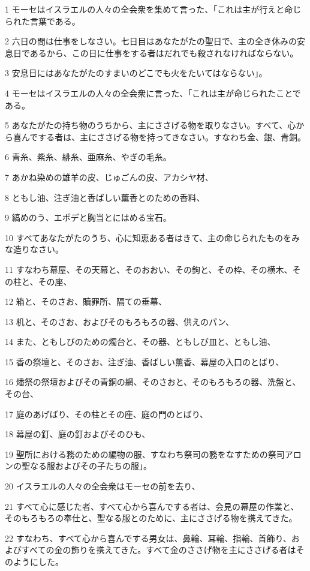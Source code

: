 \par 1 モーセはイスラエルの人々の全会衆を集めて言った、「これは主が行えと命じられた言葉である。
\par 2 六日の間は仕事をしなさい。七日目はあなたがたの聖日で、主の全き休みの安息日であるから、この日に仕事をする者はだれでも殺されなければならない。
\par 3 安息日にはあなたがたのすまいのどこでも火をたいてはならない」。
\par 4 モーセはイスラエルの人々の全会衆に言った、「これは主が命じられたことである。
\par 5 あなたがたの持ち物のうちから、主にささげる物を取りなさい。すべて、心から喜んでする者は、主にささげる物を持ってきなさい。すなわち金、銀、青銅。
\par 6 青糸、紫糸、緋糸、亜麻糸、やぎの毛糸。
\par 7 あかね染めの雄羊の皮、じゅごんの皮、アカシヤ材、
\par 8 ともし油、注ぎ油と香ばしい薫香とのための香料、
\par 9 縞めのう、エポデと胸当とにはめる宝石。
\par 10 すべてあなたがたのうち、心に知恵ある者はきて、主の命じられたものをみな造りなさい。
\par 11 すなわち幕屋、その天幕と、そのおおい、その鉤と、その枠、その横木、その柱と、その座、
\par 12 箱と、そのさお、贖罪所、隔ての垂幕、
\par 13 机と、そのさお、およびそのもろもろの器、供えのパン、
\par 14 また、ともしびのための燭台と、その器、ともしび皿と、ともし油、
\par 15 香の祭壇と、そのさお、注ぎ油、香ばしい薫香、幕屋の入口のとばり、
\par 16 燔祭の祭壇およびその青銅の網、そのさおと、そのもろもろの器、洗盤と、その台、
\par 17 庭のあげばり、その柱とその座、庭の門のとばり、
\par 18 幕屋の釘、庭の釘およびそのひも、
\par 19 聖所における務のための編物の服、すなわち祭司の務をなすための祭司アロンの聖なる服およびその子たちの服」。
\par 20 イスラエルの人々の全会衆はモーセの前を去り、
\par 21 すべて心に感じた者、すべて心から喜んでする者は、会見の幕屋の作業と、そのもろもろの奉仕と、聖なる服とのために、主にささげる物を携えてきた。
\par 22 すなわち、すべて心から喜んでする男女は、鼻輪、耳輪、指輪、首飾り、およびすべての金の飾りを携えてきた。すべて金のささげ物を主にささげる者はそのようにした。
